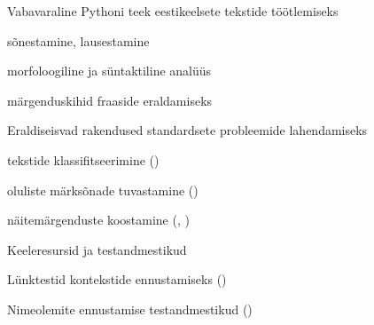\documentclass[landscape,footrule]{foils}
\begin{document}
\titlefoil



\LogoOn
\begin{triangles}
\item Vabavaraline Pythoni teek eestikeelsete tekstide töötlemiseks\vspace*{0.5ex} 
\begin{diamonds}
\item sõnestamine, lausestamine 
\item morfoloogiline ja süntaktiline analüüs
\item märgenduskihid fraaside eraldamiseks\vspace*{2ex}
\end{diamonds}
\item Eraldiseisvad rakendused standardsete probleemide lahendamiseks\vspace*{0.5ex} 
\begin{diamonds}
\item tekstide klassifitseerimine ()
\item oluliste märksõnade tuvastamine () 
\item näitemärgenduste koostamine (, ) \vspace*{2ex}
\end{diamonds} 
\item Keeleresursid ja testandmestikud
\vspace*{0.5ex} 
\begin{diamonds}
\item Lünktestid kontekstide ennustamiseks ()
\item Nimeolemite ennustamise testandmestikud () 
\end{diamonds} 
\end{triangles}

\end{document}
